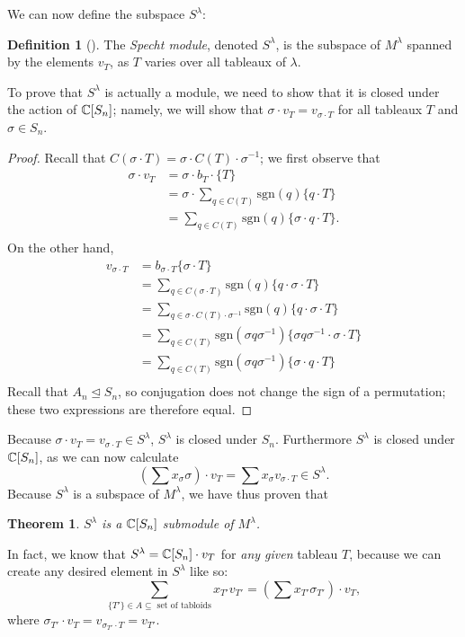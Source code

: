\documentclass[12pt,twoside]{reedthesis}
\theoremstyle{plain}   %
\newtheorem{thm}{Theorem}[section] %
\theoremstyle{definition}
\newtheorem{defn}{Definition}[section]
\theoremstyle{remark}
\numberwithin{equation}{section}
\def\normeq{\trianglelefteq}
\def\sgn{\mathrm{sgn}}
\begin{document}
  We can now define the subspace $S^\lambda$:
  \begin{defn}[{\cite[Pg. 87]{fulton}}]
    The \emph{Specht module}, denoted \emph{$S^\lambda$}, is the subspace of $M^\lambda$ spanned by the elements $v_T$, as $T$ varies over all tableaux of
    $\lambda$.
  \end{defn}
  To prove that $S^\lambda$ is actually a module, we need to show that it is closed under the action of $\mathbb{C}[S_n]$; namely,
  we will show that $\sigma \cdot v_T = v_{\sigma \cdot T}$ for all tableaux $T$ and $\sigma \in S_n$.
  \begin{proof}
    Recall that $C(\sigma \cdot T) = \sigma \cdot C(T) \cdot \sigma^{-1}$; we first observe that
    \begin{align*}
      \sigma \cdot v_{T} &= \sigma \cdot b_T \cdot \{ T\} \\
                         &= \sigma \cdot \sum_{ q \in C(T)} \sgn(q) \{q \cdot T\} \\
                         &= \sum_{ q \in C(T)} \sgn(q) \{\sigma \cdot q \cdot T\}. \\
    \end{align*}
    On the other hand,
    \begin{align*}
      v_{\sigma \cdot T} &= b_{\sigma \cdot T} \{ \sigma \cdot T\} \\
                         &= \sum_{q \in C(\sigma \cdot T)} \sgn(q) \{q \cdot \sigma \cdot T\}\\
                         &= \sum_{q \in \sigma \cdot C(T) \cdot \sigma^{-1}} \sgn(q) \{q \cdot \sigma \cdot T\}\\
                         &= \sum_{q \in C(T)} \sgn(\sigma q \sigma^{-1}) \{\sigma q \sigma^{-1} \cdot \sigma \cdot T\}\\
                         &= \sum_{q \in C(T)} \sgn(\sigma q \sigma^{-1}) \{\sigma \cdot q \cdot T\}\\      
    \end{align*}
    Recall that $A_n \normeq S_n$, so conjugation does not change the sign of a permutation; these two expressions are therefore equal.
  \end{proof}

  Because $\sigma \cdot v_T = v_{\sigma \cdot T} \in S^\lambda$, $S^\lambda$ is closed under $S_n$. Furthermore $S^\lambda$ is closed under $\mathbb{C} [S_n]$, as we can
  now calculate
  \[(\sum x_\sigma \sigma) \cdot v_T = \sum x_\sigma v_{\sigma \cdot T} \in S^\lambda.\]
  Because $S^\lambda$ is a subspace of $M^\lambda$, we have thus proven that
  \begin{thm}
    $S^\lambda$ is a $\mathbb{C}[S_n]$ submodule of $M^\lambda$.
  \end{thm}
  In fact, we know that $S^\lambda = \mathbb{C}[S_n] \cdot v_T$ for \emph{any given} tableau $T$,
  because we can create any desired element in $S^\lambda$ like so:
  \[\sum_{\{T'\} \in A \subseteq \text{ set of tabloids}} x_{T'} v_{T'} = (\sum x_{T'} \sigma_{T'}) \cdot v_T,\]
  where $\sigma_{T'} \cdot v_T = v_{\sigma_{T'} \cdot T} = v_{T'}$.
\end{document}
